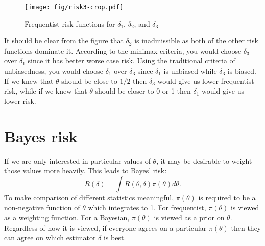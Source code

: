 \documentclass[twoside]{article}
\begin{document}
\begin{figure}[ht]
\centering
\texttt{[image: fig/risk3-crop.pdf]}
\caption{Frequentist risk functions for $\delta_1$, $\delta_2$, and $\delta_3$}
\label{fig:figure3}
\end{figure}

It should be clear from the figure that $\delta_2$ is inadmissible as both
of the other risk functions dominate it.  According to the minimax criteria,
you would choose $\delta_3$ over $\delta_1$ since it has better worse case
risk.  Using the traditional criteria of unbiasedness, you would choose
$\delta_1$ over $\delta_3$ since $\delta_1$ is unbiased while $\delta_3$ is
biased.  If we knew that $\theta$ should be close to $1/2$ then $\delta_3$
would give us lower frequentist risk, while if we knew that $\theta$ should
be closer to 0 or 1 then $\delta_1$ would give us lower risk.

\section{Bayes risk}

If we are only interested in particular values of $\theta$, it may be desirable
to weight those values more heavily.  This leads to Bayes' risk:
\begin{equation}
R(\delta) = \int R(\theta, \delta) \pi(\theta) d\theta.
\end{equation}
To make comparison of different statistics meaningful, $\pi(\theta)$ is
required to be a non-negative function of $\theta$ which integrates to 1.  For
frequentist, $\pi(\theta)$ is viewed as a weighting function.  For a Bayesian,
$\pi(\theta)$ is viewed as a prior on $\theta$. Regardless of how it is viewed,
if everyone agrees on a particular $\pi(\theta)$ then they can agree on
which estimator $\delta$ is best.



\end{document}
